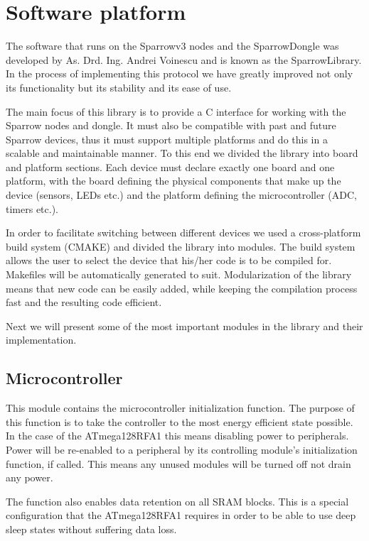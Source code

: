 
\chapter{Software platform}

The software that runs on the Sparrowv3 nodes and the SparrowDongle was
developed by As. Drd. Ing. Andrei Voinescu and is known as the SparrowLibrary.
In the process of implementing this protocol we have greatly improved not only
its functionality but its stability and its ease of use.

The main focus of this library is to provide a C interface for working with the
Sparrow nodes and dongle. It must also be compatible with past and future
Sparrow devices, thus it must support multiple platforms and do this in a
scalable and maintainable manner. To this end we divided the library into board
and platform sections.  Each device must declare exactly one board and one
platform, with the board defining the physical components that make up the
device (sensors, LEDs etc.) and the platform defining the microcontroller (ADC,
timers etc.). 

In order to facilitate switching between different devices we used a
cross-platform build system (CMAKE) and divided the library into modules. The
build system allows the user to select the device that his/her code is to be
compiled for. Makefiles will be automatically generated to suit. Modularization
of the library means that new code can be easily added, while keeping the
compilation process fast and the resulting code efficient.

Next we will present some of the most important modules in the library and
their implementation.

\section{Microcontroller}

This module contains the microcontroller initialization function. The purpose
of this function is to take the controller to the most energy efficient state
possible. In the case of the \mbox{ATmega128RFA1} this means disabling power to
peripherals. Power will be re-enabled to a peripheral by its controlling
module's initialization function, if called. This means any unused modules will
be turned off not drain any power.

The function also enables data retention on all SRAM blocks. This is a special
configuration that the \mbox{ATmega128RFA1} requires in order to be able to
use deep sleep states without suffering data loss.

